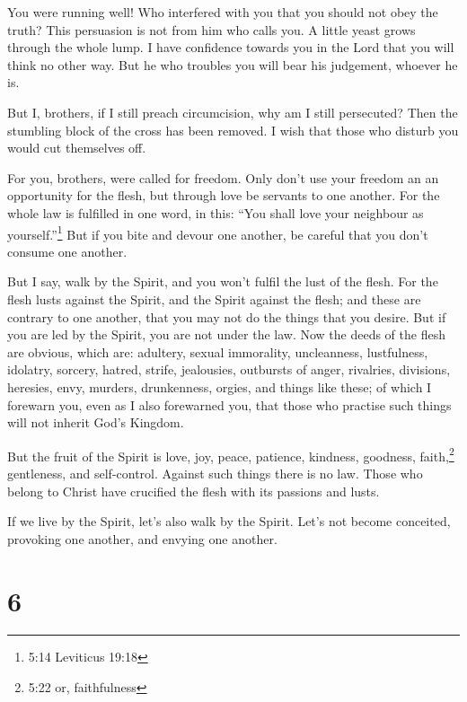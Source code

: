  You were running well! Who interfered with you that you
should not obey the truth?  This persuasion is not from him
who calls you.  A little yeast grows through the whole lump.
 I have confidence towards you in the Lord that you will
think no other way. But he who troubles you will bear his judgement,
whoever he is.

 But I, brothers, if I still preach circumcision, why am I
still persecuted? Then the stumbling block of the cross has been
removed.  I wish that those who disturb you would cut
themselves off.

 For you, brothers, were called for freedom. Only don't use
your freedom an an opportunity for the flesh, but through love be
servants to one another.  For the whole law is fulfilled in
one word, in this: ``You shall love your neighbour as
yourself.''\footnote{5:14 Leviticus 19:18}  But if you bite
and devour one another, be careful that you don't consume one another.

 But I say, walk by the Spirit, and you won't fulfil the
lust of the flesh.  For the flesh lusts against the Spirit,
and the Spirit against the flesh; and these are contrary to one another,
that you may not do the things that you desire.  But if you
are led by the Spirit, you are not under the law.  Now the
deeds of the flesh are obvious, which are: adultery, sexual immorality,
uncleanness, lustfulness,  idolatry, sorcery, hatred,
strife, jealousies, outbursts of anger, rivalries, divisions, heresies,
 envy, murders, drunkenness, orgies, and things like these;
of which I forewarn you, even as I also forewarned you, that those who
practise such things will not inherit God's Kingdom.

 But the fruit of the Spirit is love, joy, peace, patience,
kindness, goodness, faith,\footnote{5:22 or, faithfulness} 
gentleness, and self-control. Against such things there is no law.
 Those who belong to Christ have crucified the flesh with
its passions and lusts.

 If we live by the Spirit, let's also walk by the Spirit.
 Let's not become conceited, provoking one another, and
envying one another.

\hypertarget{section-5}{%
\section{6}\label{section-5}}

